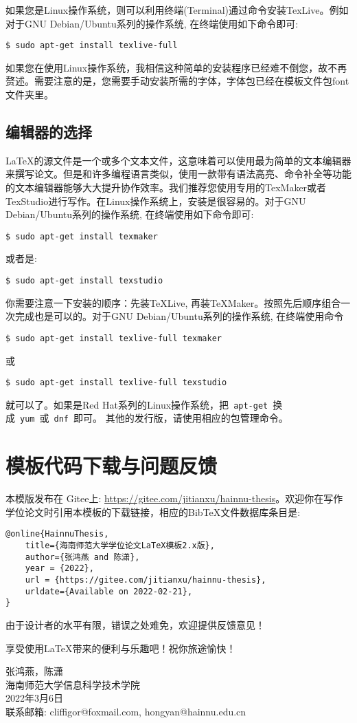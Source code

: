 如果您是Linux操作系统，则可以利用终端(Terminal)通过命令安装TexLive。例如对于GNU Debian/Ubuntu系列的操作系统, 在终端使用如下命令即可:
\begin{lstlisting}[frame=shadowbox]
	$ sudo apt-get install texlive-full
\end{lstlisting}
如果您在使用Linux操作系统，我相信这种简单的安装程序已经难不倒您，故不再赘述。需要注意的是，您需要手动安装所需的字体，字体包已经在模板文件包font文件夹里。

\subsection*{编辑器的选择}
\LaTeX 的源文件是一个或多个文本文件，这意味着可以使用最为简单的文本编辑器来撰写论文。但是和许多编程语言类似，使用一款带有语法高亮、命令补全等功能的文本编辑器能够大大提升协作效率。我们推荐您使用专用的TexMaker或者TexStudio进行写作。在Linux操作系统上，安装是很容易的。对于GNU Debian/Ubuntu系列的操作系统, 在终端使用如下命令即可:
\begin{lstlisting}[frame=shadowbox]
	$ sudo apt-get install texmaker
\end{lstlisting}
或者是:
\begin{lstlisting}[frame=shadowbox]
	$ sudo apt-get install texstudio
\end{lstlisting}
你需要注意一下安装的顺序：先装TeXLive, 再装TeXMaker。按照先后顺序组合一次完成也是可以的。对于GNU Debian/Ubuntu系列的操作系统, 在终端使用命令
\begin{lstlisting}[frame=shadowbox]
	$ sudo apt-get install texlive-full texmaker
\end{lstlisting}
或
\begin{lstlisting}[frame=shadowbox]
	$ sudo apt-get install texlive-full texstudio
\end{lstlisting}
就可以了。如果是Red Hat系列的Linux操作系统，把~\verb|apt-get|~换成~\verb|yum|~或~\verb|dnf|~即可。
其他的发行版，请使用相应的包管理命令。

\newpage

\section*{模板代码下载与问题反馈}

本模版发布在 Gitee上: \url{https://gitee.com/jitianxu/hainnu-thesis}。欢迎你在写作学位论文时引用本模板的下载链接，相应的BibTeX文件数据库条目是:
\begin{verbatim}
@online{HainnuThesis,
	title={海南师范大学学位论文LaTeX模板2.x版},
	author={张鸿燕 and 陈潇},
	year = {2022},
	url = {https://gitee.com/jitianxu/hainnu-thesis},
	urldate={Available on 2022-02-21},	
}
\end{verbatim}

{由于设计者的水平有限，错误之处难免，欢迎提供反馈意见！}

享受使用{\LaTeX{}}带来的便利与乐趣吧！祝你旅途愉快！

\begin{flushright}
	张鸿燕，陈潇\\
	海南师范大学信息科学技术学院\\
	2022年3月6日\\
	联系邮箱: cliffigor@foxmail.com, hongyan@hainnu.edu.cn
\end{flushright}